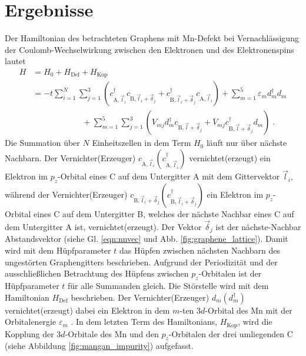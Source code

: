 \chapter{Ergebnisse}
\label{chap:berechnung}
Der Hamiltonian des betrachteten Graphens mit Mn-Defekt bei Vernachlässigung der Coulomb-Wechselwirkung zwischen den Elektronen und des Elektronenspins lautet
\begin{equation}
    \begin{aligned}
   H &=  H_0 + H_\text{Def} + H_\text{Kop}\\
    &= - t  \sum_{i=1}^N \sum_{j=1}^3
    \left ( c_{\text{A},\vec{l}_i}^\dagger c_{\text{B},\vec{l}_i+\vec{\delta}_j} + c_{\text{B},\vec{l}_i+\vec{\delta}_j}^\dagger c_{\text{A},\vec{l}_i} \right )  + \sum_{m=1}^5 \varepsilon_m d_m^\dagger d_m \\
    & \quad \quad \quad \quad \quad \quad+ \sum_{m=1}^5 \sum_{j=1}^3 \left ( V_{mj} d_m^\dagger c_{\text{B},\vec{l}+\vec{\delta}_j} + \overline{V}_{mj} c_{\text{B},\vec{l}+\vec{\delta}_j}^\dagger d_m \right )  \; \text{.} \label{eqn:full_Hamiltonian}
    \end{aligned}
\end{equation}
Die Summation über $N$ Einheitszellen in dem Term $H_0$ läuft nur über nächste Nachbarn.
Der Vernichter(Erzeuger) $c_{\text{A},\vec{l}_i}(c_{\text{A},\vec{l}_i}^{\dagger})$ vernichtet(erzeugt) ein Elektron im $p_z$-Orbital 
eines C auf dem Untergitter A mit dem Gittervektor $\vec{l}_i$, während der Vernichter(Erzeuger)
$c_{\text{B},\vec{l}_i+\vec{\delta}_j}(c_{\text{B},\vec{l}_i+\vec{\delta}_j}^{\dagger})$
ein Elektron im $p_z$-Orbital eines C auf dem Untergitter B, welches der nächste Nachbar eines C auf dem Untergitter A ist, vernichtet(erzeugt).
Der Vektor $\vec{\delta}_j$ ist der nächste-Nachbar Abstandsvektor (siehe Gl. \eqref{eqn:nnvec} und Abb. \ref{fig:graphene_lattice}).
Damit wird mit dem Hüpfparameter $t$ das Hüpfen zwischen nächsten Nachbarn des ungestörten Graphengitters beschrieben.
Aufgrund der Periodizität und der ausschließlichen Betrachtung des Hüpfens zwischen $p_z$-Orbitalen ist der  
Hüpfparameter $t$ für alle Summanden gleich.   
Die Störstelle wird mit dem Hamiltonian $H_\text{Def}$ beschrieben. 
Der Vernichter(Erzeuger) $d_m(d_m^{\dagger})$ vernichtet(erzeugt) dabei ein Elektron in dem $m$-ten $3d$-Orbital des Mn mit der 
Orbitalenergie $\varepsilon_m$ \cite{anders-fkt}.
In dem letzten Term des Hamiltonians, $H_\text{Kop}$, wird die Kopplung der $3d$-Orbitale des Mn und 
den $p_z$-Orbitalen der drei umliegenden C (siehe Abbildung \ref{fig:mangan_impurity}) aufgefasst.
